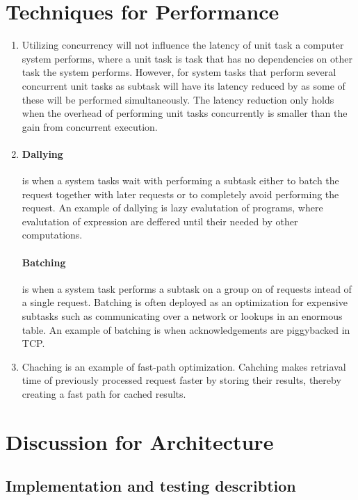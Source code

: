 \documentclass[a4paper]{article}
\begin{document}
\section{Techniques for Performance}
\begin{enumerate}

\item Utilizing concurrency will not influence the latency of unit task a computer system performs, where a unit task is task that has no dependencies on other task the system performs. However, for system tasks that perform several concurrent unit tasks as subtask will have its latency reduced by as some of these will be performed simultaneously. The latency reduction only holds when the overhead of performing unit tasks concurrently is smaller than the gain from concurrent execution.
\item \paragraph{Dallying} is when a system tasks wait with performing a subtask either to batch the request together with later requests or to completely avoid performing the request. An example of dallying is lazy evalutation of programs, where evalutation of expression are deffered until their needed by other computations.
\paragraph{Batching} is when a system task performs a subtask on a group on of requests intead of a single request. Batching is often deployed as an optimization for expensive subtasks such as communicating over a network or lookups in an enormous table. An example of batching is when acknowledgements are piggybacked in TCP.
\item Chaching is an example of fast-path optimization. Cahching makes retriaval time of previously processed request faster by storing their results, thereby creating a fast path for cached results.
\end{enumerate}
\section{Discussion for Architecture}
\subsection{Implementation and testing describtion}
\end{document}
